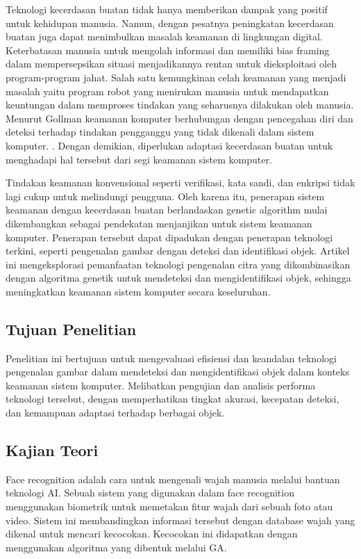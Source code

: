 \documentclass[conference]{IEEEtran}
\begin{document}
Teknologi kecerdasan buatan tidak hanya memberikan dampak yang positif untuk kehidupan manusia. Namun, dengan pesatnya peningkatan kecerdasan buatan juga dapat menimbulkan masalah keamanan di lingkungan digital. Keterbatasan manusia untuk mengolah informasi dan memiliki bias framing dalam mempersepsikan situasi menjadikannya rentan untuk dieksploitasi oleh program-program jahat. Salah satu kemungkinan celah keamanan yang menjadi masalah yaitu program robot yang menirukan manusia untuk mendapatkan keuntungan dalam memproses tindakan yang seharusnya dilakukan oleh manusia. Menurut Gollman keamanan komputer berhubungan dengan pencegahan diri dan deteksi terhadap tindakan pengganggu yang tidak dikenali dalam sistem komputer. \cite{Adrianto2016}. Dengan demikian, diperlukan adaptasi kecerdasan buatan untuk menghadapi hal tersebut dari segi keamanan sistem komputer.

Tindakan keamanan konvensional seperti verifikasi, kata sandi, dan enkripsi tidak lagi cukup untuk melindungi pengguna. Oleh karena itu, penerapan sistem keamanan dengan kecerdasan buatan berlandaskan genetic algorithm mulai dikembangkan sebagai pendekatan menjanjikan untuk sistem keamanan komputer. Penerapan tersebut dapat dipadukan dengan penerapan teknologi terkini, seperti pengenalan gambar dengan deteksi dan identifikasi objek. Artikel ini mengeksplorasi pemanfaatan teknologi pengenalan citra yang dikombinasikan dengan algoritma genetik untuk mendeteksi dan mengidentifikasi objek, sehingga meningkatkan keamanan sistem komputer secara keseluruhan.

\subsection{Tujuan Penelitian}
Penelitian ini bertujuan untuk mengevaluasi efisiensi dan keandalan teknologi pengenalan gambar dalam mendeteksi dan mengidentifikasi objek dalam konteks keamanan sistem komputer. Melibatkan pengujian dan analisis performa teknologi tersebut, dengan memperhatikan tingkat akurasi, kecepatan deteksi, dan kemampuan adaptasi terhadap berbagai objek.

\subsection{Kajian Teori}
Face recognition adalah cara untuk mengenali wajah manusia melalui bantuan teknologi AI. Sebuah sistem yang digunakan dalam face recognition menggunakan biometrik untuk memetakan fitur wajah dari sebuah foto atau video. Sistem ini membandingkan informasi tersebut dengan database wajah yang dikenal untuk mencari kecocokan. Kecocokan ini didapatkan dengan menggunakan algoritma yang dibentuk melalui GA.
\end{document}
